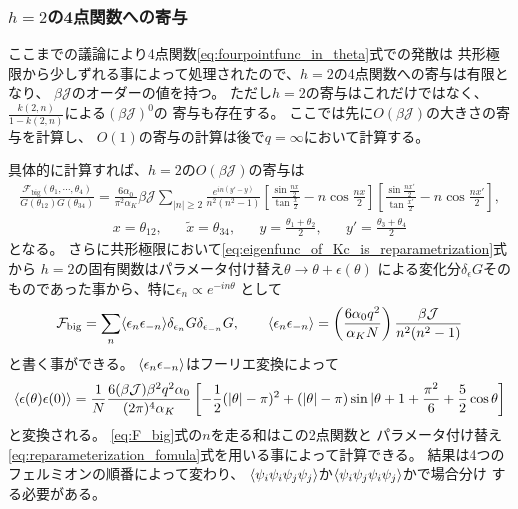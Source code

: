\subsubsection{$h = 2$の4点関数への寄与}
ここまでの議論により4点関数\eqref{eq:fourpointfunc_in_theta}式での発散は
共形極限から少しずれる事によって処理されたので、$h=2$の4点関数への寄与は有限となり、
$\beta\mathcal{J}$のオーダーの値を持つ。
ただし$h=2$の寄与はこれだけではなく、$\frac{k(2,n)}{1-k(2,n)}$による$(\beta\mathcal{J})^0$の
寄与も存在する。
ここでは先に$O(\beta\mathcal{J})$の大きさの寄与を計算し、
$O(1)$の寄与の計算は後で$q=\infty$において計算する。

具体的に計算すれば、$h=2$の$O(\beta\mathcal{J})$の寄与は
\begin{align}
	\frac{\mathcal{F}_{\mathrm{big}}(\theta_1,\cdots,\theta_4)}{G(\theta_{12})G(\theta_{34})}
	= \frac{6\alpha_0}{\pi^2\alpha_K}\beta\mathcal{J}\sum_{|n|\geq 2}
		\frac{e^{in(y' - y)}}{n^2(n^2 - 1)}
		\left[
			\frac{\sin\frac{nx}{2}}{\tan\frac{x}{2}} - n\cos\frac{nx}{2}
		\right]
		\left[
			\frac{\sin\frac{nx'}{2}}{\tan\frac{x'}{2}} - n\cos\frac{nx'}{2}
		\right],
	\label{eq:F_big}
\end{align}
\begin{align}
	x = \theta_{12},\hspace{20pt}
	\tilde{x} = \theta_{34},\hspace{20pt}
	y = \frac{\theta_1 + \theta_2}{2},\hspace{20pt}
	y' = \frac{\theta_3 + \theta_4}{2}
\end{align}
となる。
さらに共形極限において\eqref{eq:eigenfunc_of_Kc_is_reparametrization}式から
$h=2$の固有関数はパラメータ付け替え$\theta\to\theta + \epsilon(\theta)$
による変化分$\delta_{\epsilon}G$そのものであった事から、特に$\epsilon_n \propto e^{-in\theta}$
として
\begin{align}
	\mathcal{F}_{\mathrm{big}} = 
	\sum_n \langle \epsilon_n\epsilon_{-n} \rangle\delta_{\epsilon_n}G\delta_{\epsilon_{-n}}G,
	\hspace{20pt}
	\langle \epsilon_n\epsilon_{-n} \rangle = 
	\left(\frac{6\alpha_0q^2}{\alpha_K N}\right)\frac{\beta\mathcal{J}}{n^2(n^2-1)}
\end{align}
と書く事ができる。
$\langle \epsilon_n\epsilon_{-n} \rangle$はフーリエ変換によって
\begin{align}
	\langle \epsilon(\theta)\epsilon(0) \rangle
	= \frac{1}{N}\frac{6(\beta\mathcal{J}) \beta^2 q^2 \alpha_0}{(2\pi)^4 \alpha_K}
	\left[
		-\frac{1}{2}(|\theta| - \pi)^2 + (|\theta| - \pi)\sin|\theta
		+ 1 + \frac{\pi^2}{6} + \frac{5}{2}\cos\theta
	\right]
	\label{eq:propagator_of_epsilon}
\end{align}
と変換される。
\eqref{eq:F_big}式の$n$を走る和はこの2点関数と
パラメータ付け替え\eqref{eq:reparameterization_fomula}式を用いる事によって計算できる。
結果は4つのフェルミオンの順番によって変わり、
$\langle \psi_i\psi_i\psi_j\psi_j \rangle$か$\langle \psi_i\psi_j\psi_i\psi_j \rangle$かで場合分け
する必要がある。

